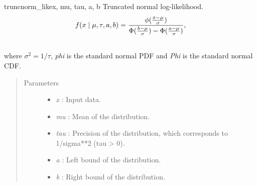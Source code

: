 \hypertarget{pymc.distributions.truncnorm_like}{}\begin{funcdesc}{truncnorm\_like}{x, mu, tau, a, b}
Truncated normal log-likelihood.
\begin{gather}
\begin{split}f(x \mid \mu, \tau, a, b) = \frac{\phi(\frac{x-\mu}{\sigma})} {\Phi(\frac{b-\mu}{\sigma}) - \Phi(\frac{a-\mu}{\sigma})},\end{split}\notag\\\begin{split}\end{split}\notag
\end{gather}
where $\sigma^2=1/\tau$, \emph{phi} is the standard normal PDF and \emph{Phi} is the standard normal CDF.
\begin{quote}\begin{description}
\item[Parameters] \leavevmode\begin{itemize}
\item {} 
\emph{x} : Input data.

\item {} 
\emph{mu} : Mean of the distribution.

\item {} 
\emph{tau} : Precision of the distribution, which corresponds to 1/sigma**2 (tau \textgreater{} 0).

\item {} 
\emph{a} : Left bound of the distribution.

\item {} 
\emph{b} : Right bound of the distribution.

\end{itemize}

\end{description}\end{quote}
\end{funcdesc}

